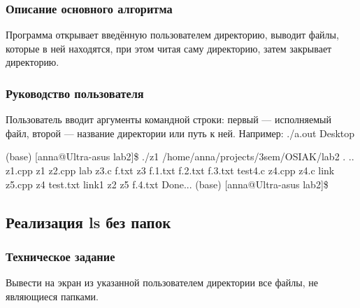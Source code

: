 \documentclass[a4paper,12pt]{extarticle}
\begin{document}
\subsubsection{Описание основного алгоритма}
Программа открывает введённую пользователем директорию, выводит файлы, которые в ней находятся, при этом читая саму директорию, затем закрывает директорию.

\subsubsection{Руководство пользователя}
Пользователь вводит аргументы командной строки: первый --- исполняемый файл, второй --- название директории или путь к ней. Например: ./a.out Desktop

(base) [anna@Ultra-asus lab2]\$ ./z1  /home/anna/projects/3sem/OSIAK/lab2 \newline
. \newline
.. \newline
z1.cpp \newline
z1\newline
z2.cpp\newline
lab\newline
z3.c\newline
f.txt\newline
z3\newline
f.1.txt\newline
f.2.txt\newline
f.3.txt\newline
test4.c\newline
z4.cpp\newline
z4.c\newline
link\newline
z5.cpp\newline
z4\newline
test.txt\newline
link1\newline
z2\newline
z5\newline
f.4.txt\newline
Done...\newline
(base) [anna@Ultra-asus lab2]\$ \newline

\subsection{Реализация ls без папок}
\subsubsection{Техническое задание}
Вывести   на   экран   из   указанной пользователем директории   все файлы, не являющиеся папками.
\end{document}
